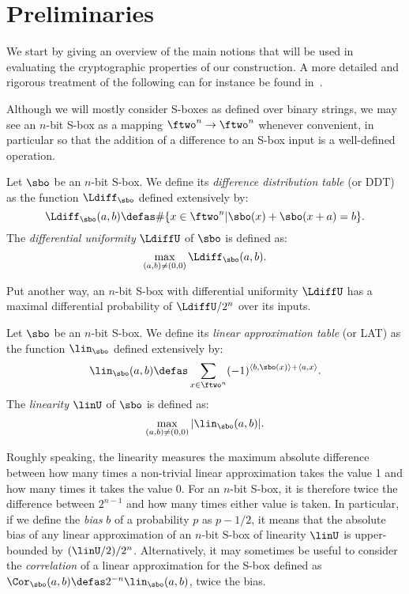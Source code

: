 \section{Preliminaries}
\label{sec:elprelim}

We start by giving an overview of the main notions that will be used in evaluating the cryptographic properties of our construction.
A more detailed and rigorous treatment of the following can for instance be found in~\cite{phdRoue}.

\bigskip

Although we will mostly consider S-boxes as defined over binary strings, we may see an $n$-bit S-box as a mapping
$\ftwo^n \rightarrow \ftwo^n$ whenever convenient, in particular so that the addition of a difference to an S-box
input is a well-defined operation.

\begin{defi}
\label{diffS}
Let $\sbo$ be an $n$-bit S-box. We define its
\emph{difference distribution table} (or DDT) as the function $\Ldiff_{\sbo}$ defined extensively by:
\[
\Ldiff_{\sbo}(a,b) \defas \#\{x \in \ftwo^n | \sbo(x) + \sbo(x + a) = b\}.
\]
The \emph{differential uniformity} $\LdiffU$ of $\sbo$ is defined as:
\[
\max_{(a,b) \neq (0,0)} \Ldiff_{\sbo}(a,b).
\]
\end{defi}
Put another way, an $n$-bit S-box with differential uniformity $\LdiffU$ has a maximal differential probability
of $\LdiffU/2^n$ over its inputs.


\begin{defi}
\label{linS}
Let $\sbo$ be an $n$-bit S-box. We define its
\emph{linear approximation table} (or LAT) as the function $\lin_{\sbo}$ defined extensively by:
\[
\lin_{\sbo}(a,b) \defas \sum_{x \in \ftwo^n} (-1)^{\langle b,\sbo(x)\rangle + \langle a, x\rangle}.
\]
The \emph{linearity} $\linU$ of $\sbo$ is defined as:
\[
\max_{(a,b) \neq (0,0)} |\lin_{\sbo}(a,b)|.
\]
\end{defi}
Roughly speaking, the linearity measures the maximum absolute difference between how many times a non-trivial linear approximation
takes the value 1 and how many times it takes the value 0. For an $n$-bit S-box, it is therefore twice the difference between $2^{n-1}$
and how many times either value is taken.
In particular, if we define the \emph{bias} $b$ of a probability $p$ as $p - 1/2$, it means that
the absolute bias of any linear approximation of an $n$-bit S-box of linearity $\linU$ is upper-bounded by $(\linU/2)/2^n$.
Alternatively, it may sometimes be useful to consider the \emph{correlation} of a linear approximation for the S-box
defined as $\Cor_{\sbo}(a,b) \defas 2^{-n}\lin_{\sbo}(a,b)$, \ie twice the bias.

